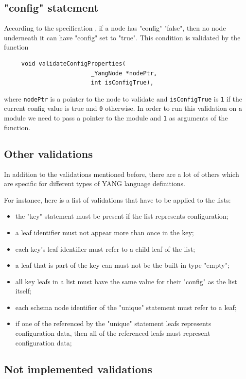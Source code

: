 \documentclass[conference]{IEEEtran}
\begin{document}
\subsection{"config" statement}
According to the specification \cite{bib4}, if a node has "config" "false", then no node underneath it can have "config" set to "true".
This condition is validated by the function
\small
\begin{verbatim}
     void validateConfigProperties(
                         _YangNode *nodePtr, 
                         int isConfigTrue),
\end{verbatim}
\normalsize
where \texttt{nodePtr} is a pointer to the node to validate and \texttt{isConfigTrue} is \texttt{1} if the current config value is true and \texttt{0} otherwise.
In order to run this validation on a module we need to pass a pointer to the module and \texttt{1} as arguments of the function. 

\subsection{Other validations}
In addition to the validations mentioned before, there are a lot of others which are specific for different types of YANG language definitions.  

For instance, here is a list of validations that have to be applied to the lists:
\begin{itemize}
\item the "key" statement must be present if the list represents configuration;
\item a leaf identifier must not appear more than once in the key;
\item each key's leaf identifier must refer to a child leaf of the list;
\item a leaf that is part of the key can must not be the built-in type "empty";
\item all key leafs in a list must have the same value for their "config" as the list itself;
\item each schema node identifier of the "unique" statement must refer to a leaf;
\item if one of the referenced by the "unique" statement leafs represents configuration data, then all of the referenced leafs must represent configuration data;
\end{itemize}

\subsection{Not implemented validations}
\end{document}
